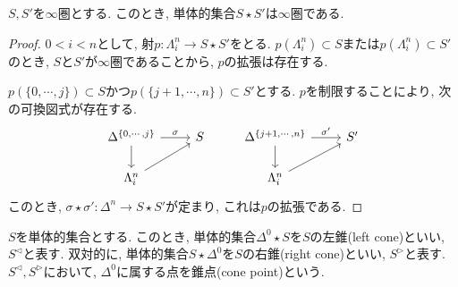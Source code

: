 \documentclass[uplatex, a4paper, 14Q, dvipdfmx]{jsreport}
\begin{document}
\begin{proposition} \label{prop.1.2.8.3}
  $S,S'$を$\infty$圏とする. 
  このとき, 単体的集合$S \star S'$は$\infty$圏である.
\end{proposition}

\begin{proof}
  $0 < i < n$として, 射$p : \Lambda^n_i \to S \star S'$をとる. 
  $p(\Lambda^n_i) \subset S$または$p(\Lambda^n_i) \subset S'$のとき, $S$と$S'$が$\infty$圏であることから, $p$の拡張は存在する. 

  $p(\{0,\cdots,j\}) \subset S$かつ$p(\{j+1,\cdots,n\}) \subset S'$とする. 
  $p$を制限することにより, 次の可換図式が存在する. 
  \[\begin{tikzcd}
    {\Delta^{\{0,\cdots,j\}}} & S & {\Delta^{\{j+1,\cdots,n\}}} & {S'} \\
    {\Lambda^n_i} && {\Lambda^n_i}
    \arrow["\sigma", from=1-1, to=1-2]
    \arrow[from=1-1, to=2-1]
    \arrow["{\sigma'}", from=1-3, to=1-4]
    \arrow[from=1-3, to=2-3]
    \arrow[from=2-1, to=1-2]
    \arrow[from=2-3, to=1-4]
  \end{tikzcd}\]
  このとき, $\sigma \star \sigma' : \Delta^n \to S \star S'$が定まり, これは$p$の拡張である.
\end{proof}

\begin{notation}[左錐と右錐] \label{nota.1.2.8.4}
  $S$を単体的集合とする. 
  このとき, 単体的集合$\Delta^0 \star S$を$S$の左錐(left cone)といい, $S^\triangleleft$と表す.
  双対的に, 単体的集合$S \star \Delta^0$を$S$の右錐(right cone)といい, $S^\triangleright$と表す. 
  $S^\triangleleft, S^\triangleright$において, $\Delta^0$に属する点を錐点(cone point)という. 
\end{notation}
\end{document}
